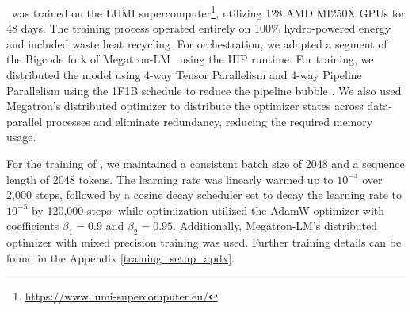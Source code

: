 

\system\ was trained on the LUMI supercomputer\footnote{\url{https://www.lumi-supercomputer.eu/}}, utilizing 128 AMD MI250X GPUs for 48 days. The training process operated entirely on 100\% hydro-powered energy and included waste heat recycling. For orchestration, we adapted a segment of the Bigcode fork of Megatron-LM~\citep{narayanan2021efficient} using the HIP runtime. 
For training, we distributed the model using 4-way Tensor Parallelism and 4-way Pipeline Parallelism using the 1F1B schedule to reduce the pipeline bubble \citep{narayanan2021efficient}. We also used Megatron's distributed optimizer \citep{narayanan2021efficient} to distribute the optimizer states across data-parallel processes and eliminate redundancy, reducing the required memory usage.


For the training of \system, we maintained a consistent batch size of 2048 and a sequence length of 2048 tokens. The learning rate was linearly warmed up to $10^{-4}$ over 2,000 steps, followed by a cosine decay scheduler set to decay the learning rate to $10^{-5}$ by 120,000 steps. 
while optimization utilized the AdamW optimizer \citep{adam, weight-decay} with coefficients $\beta_1=0.9$ and $\beta_2=0.95$. Additionally, Megatron-LM's distributed optimizer with mixed precision training \citep{mixed-precision} was used. Further training details can be found in the Appendix \ref{training_setup_apdx}.


